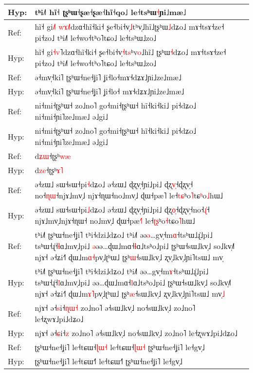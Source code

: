 \documentclass[10pt]{article}
\DeclareRobustCommand{\hl}[1]{{\textcolor{red}{#1}}}
\begin{document}
\begin{longtable}{ll}
Hyp: & tʰi˩˥ hĩ˧ ʈʂʰɯ˧ʂæ˧ʂæ˧hĩ˧qo˩ le˧tsʰɯ\hl{˧}ɲi˩mæ˩ \\ 
\midrule 
Ref: & hĩ˧ gi\hl{˩}\hl{˥}\hl{ }\hl{w}\hl{ɤ}\hl{˩}˥dzɑ˧hĩ˧ki˧ ʂe˧bi˧v̩\hl{˩}tʰv\hl{̩}˩hĩ˩ʈʂʰɯ\hl{˩}dʑo˩ mɤ˧tsɤ˧ze˧ pi˧zo˩ tʰi˩˥ le˧wo˧tʰo˥tɕo˩ le˧tsʰɯ˩zo˩ \\ 
Hyp: & hĩ˧ gi\hl{˧}\hl{v}˥dzɑ˧hĩ˧ki˧ ʂe˧bi˧v̩\hl{˧}t\hl{s}ʰv\hl{o}˩hĩ˩\hl{ }ʈʂʰɯ\hl{˧}dʑo˩ mɤ˧tsɤ˧ze˧ pi˧zo˩ tʰi˩˥ le˧wo˧tʰo˥tɕo˩ le˧tsʰɯ˩zo˩ \\ 
\midrule 
Ref: & ə˧mv̩˧ki˥ ʈʂʰɯ˧ne˧ʝi˥ ʝi˧lo˧mɤ˧dʑɤ˩ɲi˩ze˩mæ˩ \\ 
Hyp: & ə˧mv̩˧ki˥ ʈʂʰɯ˧ne˧ʝi˥ ʝi˧lo˧\hl{ }mɤ˧dʑɤ˩ɲi˩ze˩mæ˩ \\ 
\midrule 
Ref: & ni˧mi˧ʈʂʰɯ˧ zo˩no˥ go˧mi˧ʈʂʰɯ˧ hĩ˧ki˧ki˩ pi˧dʑo˩ ni˧mi˧ɲi˥ze˩mæ˩ ə˩gi˩ \\ 
Hyp: & ni˧mi˧ʈʂʰɯ˧ zo˩no˥ go˧mi˧ʈʂʰɯ˧ hĩ˧ki˧ki˩ pi˧dʑo˩ ni˧mi˧ɲi˥ze˩mæ˩ ə˩gi˩ \\ 
\midrule 
Ref: & d\hl{ʑ}\hl{ɯ}˧ʈʂʰ\hl{w}\hl{æ} \\ 
Hyp: & d\hl{z}\hl{e}˧ʈʂʰ\hl{ɤ}\hl{˥} \\ 
\midrule 
Ref: & ə˧zɯ˩ sɯ˧sɯ˧pi\hl{˧}dʑo˩ ə˧zɯ˩ ɖʐv̩˧ɲi˩pi˩ ɖʐ\hl{v}̩˧ɖʐv̩˧\hl{ }no˧\hl{ɳ}\hl{ɯ}˧njɤ˩mv̩˩\hl{ }njɤ˧ɳɯ˧no˩mv̩˩ ɖɯ˧pæ˥ le˧\hl{t}\hl{ɕ}ʰo\hl{˥}tɕ\hl{ʰ}o\hl{˩}hɯ˩ \\ 
Hyp: & ə˧zɯ˩ sɯ˧sɯ˧pi\hl{˩}dʑo˩ ə˧zɯ˩ ɖʐv̩˧ɲi˩pi˩ ɖʐ\hl{o}̩˧ɖʐv̩˧no˧\hl{ɻ}\hl{̍}˧\hl{ }njɤ˩mv̩˩njɤ˧ɳɯ˧\hl{ }no˩mv̩˩ ɖɯ˧pæ\hl{˧}˥ le˧\hl{ʈ}\hl{ʂ}ʰo\hl{˧}tɕo\hl{˥}hɯ˩ \\ 
\midrule 
Ref: & tʰi˩˥ ʈʂʰɯ˧ne˧ʝi˥ tʰi˧dzi˩dʑo˩ tʰi˩˥ əə\hl{ə}…gv̩˧m\hl{ɑ}˧tsʰɯ˩ɻ̍˩pi˩ tsʰɯ˧ɻ̍˧\hl{ɬ}ɑ˩mv̩˩pi˩ \hl{ə}əə…ɖɯ˩mɑ˧\hl{ɬ}ɑ˩tsʰo˩pi˩ ʈʂʰɯ˧sɯ˩kv̩˩ so˩kv̩˩˥ njɤ˧ ə˧ʑi˧˥ ɖɯ˩m\hl{ɑ}\hl{˧}pv̩˩ʈʰɯ˩ ʈʂʰ\hl{ɯ}˧sɯ˩kv̩˩ ʐv̩˩kv̩˩ɲi˥tsɯ˩ mv̩ \\ 
Hyp: & tʰi˩˥ ʈʂʰɯ˧ne˧ʝi˥ tʰi˧dzi˩dʑo˩ tʰi˩˥ əə…gv̩˧m\hl{ɤ}˧tsʰɯ˩ɻ̍˩pi˩ tsʰɯ˧ɻ̍˧\hl{l}ɑ˩mv̩˩pi˩ əə…ɖɯ˩mɑ˧\hl{l}ɑ˩tsʰo˩pi˩ ʈʂʰɯ˧sɯ˩kv̩˩ so˩kv̩˩˥ njɤ˧ ə˧ʑi˧˥ ɖɯ˩m\hl{ɤ}\hl{˥}pv̩˩ʈʰɯ˩ ʈʂʰ\hl{æ}˧sɯ˩kv̩˩ ʐv̩˩kv̩˩ɲi˥tsɯ˩ mv̩\hl{˩} \\ 
\midrule 
Ref: & njɤ˧ ə˧\hl{s}i˧\hl{ɳ}\hl{ɯ}\hl{˧} zo˩no˥ ə˧sɯ˩kv̩˩ no˧sɯ˩kv̩˩ zo˩no˥ le˧ʐwɤ˩pi˩dʑo˩ \\ 
Hyp: & njɤ˧ ə˧\hl{ɕ}i˧\hl{z} zo˩no˥ ə˧sɯ˩kv̩˩ no˧sɯ˩kv̩˩ zo˩no˥ le˧ʐwɤ˩pi˩dʑo˩ \\ 
\midrule 
Ref: & ʈʂʰɯ˧ne˧ʝi˥ le˧tɕɯ˧\hl{ɭ}\hl{ɯ}\hl{˧} le˧tɕɯ˧\hl{ɭ}\hl{ɯ}\hl{˧} ʈʂʰɯ˧ne˧ʝi˥ le˧gv̩˩ \\ 
Hyp: & ʈʂʰɯ˧ne˧ʝi˥ le˧tɕɯ˧\hl{˥} le˧tɕɯ˧\hl{˥} ʈʂʰɯ˧ne˧ʝi˥ le˧gv̩˩ \\ 

\end{longtable}
\end{document}
